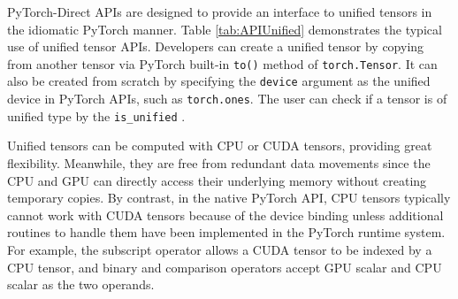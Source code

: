 PyTorch-Direct APIs are designed to provide an interface to unified tensors in the idiomatic PyTorch manner.
Table \ref{tab:APIUnified} demonstrates the typical use of unified tensor APIs.
Developers can create a unified tensor by copying from another tensor via PyTorch built-in \texttt{to()} method of \texttt{torch.Tensor}.
It can also be created from scratch by specifying the \texttt{device} argument as the unified device in PyTorch APIs, such as \texttt{torch.ones}.
The user can check if a tensor is of unified type by  the \texttt{is\_unified} .

Unified tensors can be computed with CPU or CUDA tensors, providing great flexibility.
Meanwhile, they are free from redundant data movements since the CPU and GPU can directly access their underlying memory without creating temporary copies.
By contrast, in the native PyTorch API, CPU tensors typically cannot work with CUDA tensors because of the device binding unless additional routines to handle them have been implemented in the PyTorch runtime system.
For example, the subscript operator allows a CUDA tensor to be indexed by a CPU tensor, and binary and comparison operators accept GPU scalar and CPU scalar as the two operands.


